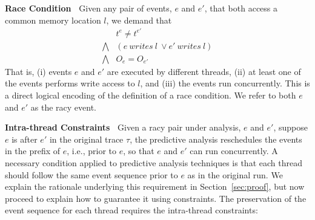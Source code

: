 


{\bf Race Condition\ } Given any pair  of events, $e$ and $e'$,  that both access a common memory location $l$, we demand that
$$
\begin{array}{rl}
& t^e \neq t^{e'} \\
\bigwedge 	& (e\  writes\  l\   \vee e'\  writes\  l) \\
\bigwedge   & O_{e} = O_{e'}
\end{array}
$$
That is, (i) events $e$ and $e'$ are executed by different threads, (ii) at least one of the events performs write access to $l$, and (iii) the events run concurrently. This is a direct logical encoding of the definition of a race condition. We refer to both $e$ and $e'$ as the racy event.

{\bf Intra-thread Constraints\ } Given a racy pair under analysis, $e$ and $e'$, suppose $e$ is after $e'$ in the original trace $\tau$, the predictive analysis reschedules the events in the prefix of $e$, i.e., prior to $e$, so that $e$ and $e'$ can run concurrently. A necessary condition applied to predictive analysis techniques is that each thread should follow the same event sequence prior to $e$ as in the original run.  We explain the rationale underlying this requirement in Section~\ref{sec:proof}, but now proceed to explain how to guarantee it using constraints. The preservation of the event sequence for each thread requires the intra-thread constraints:

